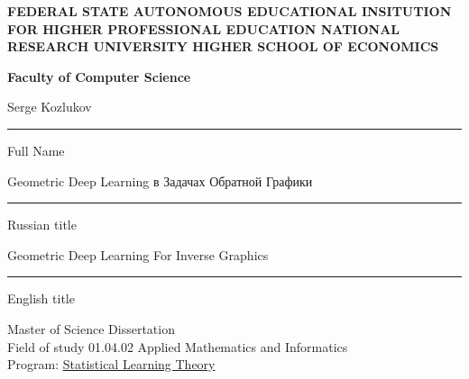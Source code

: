 \clearpage

\thispagestyle{empty}

\begin{center}
\textsc{\textbf{FEDERAL STATE AUTONOMOUS EDUCATIONAL INSITUTION FOR \linebreak HIGHER PROFESSIONAL EDUCATION NATIONAL RESEARCH \linebreak UNIVERSITY\linebreak
\guillemotleft HIGHER SCHOOL OF ECONOMICS\guillemotright}}


\textbf{\textup{\textnormal{Faculty of Computer Science}}}

Serge Kozlukov

\hrule height 0.3mm

Full Name

Geometric Deep Learning \textrussian{в Задачах Обратной Графики}

\hrule height 0.3mm

Russian title

Geometric Deep Learning For Inverse Graphics

\hrule height 0.3mm

English title

\vspace{42pt}

Master of Science Dissertation\\
Field of study 01.04.02 \guillemotleft Applied Mathematics and Informatics\guillemotright\\
Program:
\uline{\hspace{3.5em}Statistical Learning Theory\hspace{3.5em}}
\end{center}

\vspace{5pt}

